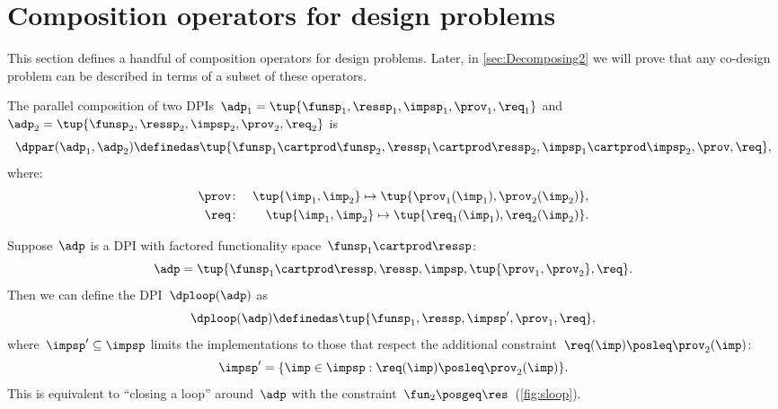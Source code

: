 
\section{Composition operators for design problems}

This section defines a handful of composition operators for design
problems.
Later, in \cref{sec:Decomposing2} we will prove that any co-design
problem can be described in terms of a subset of these operators.

\label{sec:threeoperators}

\begin{definition}[$\dppar$]
	\label{def:parallel}
	The parallel composition of two DPIs~$\adp_{1}=\tup{\funsp_{1},\ressp_{1},\impsp_{1},\prov_{1},\req_{1}}$
	and~$\adp_{2}=\tup{\funsp_{2},\ressp_{2},\impsp_{2},\prov_{2},
			\req_{2}}$ is
	\begin{equation*}
		\dppar(\adp_{1},\adp_{2})\definedas\tup{\funsp_{1}\cartprod\funsp_{2},\ressp_{1}\cartprod\ressp_{2},\impsp_{1}\cartprod\impsp_{2},\prov,\req} ,
	\end{equation*}
	where:
	\begin{eqnarray}
		\prov & \colon & \tup{ \imp_{1},\imp_{2}} \mapsto \tup{\prov_{1}(\imp_{1}),\prov_{2}(\imp_{2})} ,\label{eq:dppar-exec} \\
		\req  & \colon & \tup{ \imp_{1},\imp_{2}}\mapsto\tup{\req_{1}(\imp_{1}),\req_{2}(\imp_{2})} .
		\nonumber
	\end{eqnarray}

\end{definition}

\begin{definition}[$\dploop$]
	\label{def:dp_loop}
	Suppose~$\adp$ is a DPI with factored functionality
	space~$\funsp_{1}\cartprod\ressp$:
	\begin{equation*}
		\adp=\tup{ \funsp_{1}\cartprod\ressp,\ressp,\impsp,\tup{ \prov_{1},\prov_{2}} ,\req}.
	\end{equation*}
	Then we can define the DPI~$\dploop(\adp)$ as
	\begin{equation*}
		\dploop(\adp)\definedas\tup{ \funsp_{1},\ressp,\impsp',\prov_{1},\req} ,
	\end{equation*}
	where~$\impsp'\subseteq\impsp$ limits the implementations to those
	that respect the additional constraint~$\req(\imp)\posleq\prov_{2}(\imp)$:
	\begin{equation*}
		\impsp'=\{\imp\in\impsp:\req(\imp)\posleq\prov_{2}(\imp)\}.
	\end{equation*}
	This is equivalent to ``closing a loop'' around~$\adp$ with
	the constraint~$\fun_{2}\posgeq\res$~(\cref{fig:sloop}).
\end{definition}

